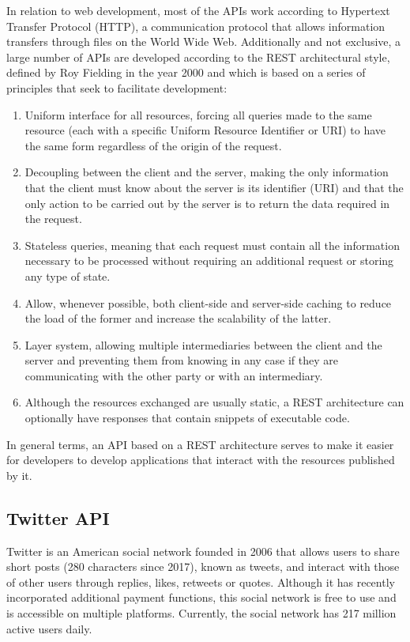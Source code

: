 \nonzeroparskip In relation to web development, most of the APIs work according to Hypertext Transfer Protocol (HTTP), a communication protocol that allows information transfers through files on the World Wide Web. Additionally and not exclusive, a large number of APIs are developed according to the REST architectural style, defined by Roy Fielding in the year 2000 and which is based on a series of principles that seek to facilitate development:
\begin{enumerate}
	\item Uniform interface for all resources, forcing all queries made to the same resource (each with a specific Uniform Resource Identifier or URI) to have the same form regardless of the origin of the request.
	\item Decoupling between the client and the server, making the only information that the client must know about the server is its identifier (URI) and that the only action to be carried out by the server is to return the data required in the request.
	\item Stateless queries, meaning that each request must contain all the information necessary to be processed without requiring an additional request or storing any type of state.
	\item Allow, whenever possible, both client-side and server-side caching to reduce the load of the former and increase the scalability of the latter.
	\item Layer system, allowing multiple intermediaries between the client and the server and preventing them from knowing in any case if they are communicating with the other party or with an intermediary.
	\item Although the resources exchanged are usually static, a REST architecture can optionally have responses that contain snippets of executable code.
\end{enumerate}

\nonzeroparskip In general terms, an API based on a REST architecture serves to make it easier for developers to develop applications that interact with the resources published by it.

\subsection{Twitter API}
\nonzeroparskip Twitter is an American social network founded in 2006 that allows users to share short posts (280 characters since 2017), known as tweets, and interact with those of other users through replies, likes, retweets or quotes. Although it has recently incorporated additional payment functions, this social network is free to use and is accessible on multiple platforms. Currently, the social network has 217 million active users daily.

